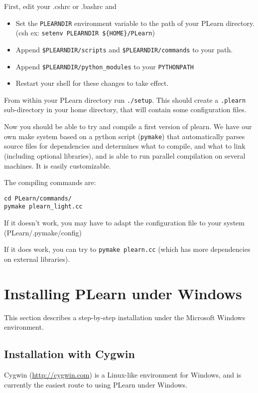 \documentclass[11pt]{book}
\begin{document}
First, edit your .cshrc or .bashrc and 
\begin{itemize}
\item Set the {\tt PLEARNDIR} environment variable to the path of your PLearn directory. 
(csh ex: \verb!setenv PLEARNDIR ${HOME}/PLearn!)
\item Append \verb!$PLEARNDIR/scripts! and \verb!$PLEARNDIR/commands! to your path.
\item Append \verb!$PLEARNDIR/python_modules! to your \verb!PYTHONPATH!
\item Restart your shell for these changes to take effect.
\end{itemize}

From within your PLearn directory run {\tt ./setup}. This should create a
{\tt .plearn} sub-directory in your home directory, that will contain some
configuration files.

Now you should be able to try and compile a first version of plearn.
We have our own make system based on a python script ({\tt pymake}) that
automatically parses source files for dependencies and determines what to
compile, and what to link (including optional libraries), and is able to
run parallel compilation on several machines.  It is easily
customizable.

The compiling commands are:
\begin{verbatim}
cd PLearn/commands/
pymake plearn_light.cc
\end{verbatim}

If it doesn't work, you may have to adapt the configuration file to your system
(PLearn/.pymake/config)

If it does work, you can try to \verb!pymake plearn.cc! (which has more dependencies on external libraries).

\section{Installing PLearn under Windows}

This section describes a step-by-step installation under the Microsoft Windows environment.

\subsection{Installation with Cygwin}

Cygwin (\url{http://cygwin.com}) is a Linux-like environment for Windows, and is
currently the easiest route to using PLearn under Windows.
\end{document}
